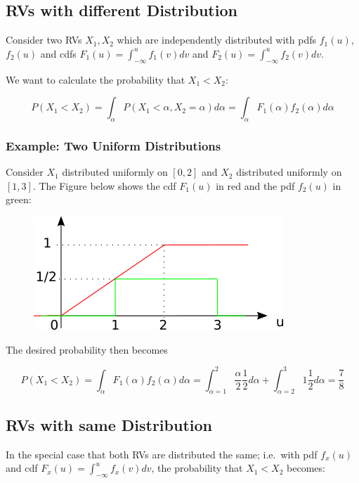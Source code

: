 
\subsection{RVs with different Distribution}

Consider two RVs \(X_1, X_2\) which are independently distributed with
pdfs \(f_1(u)\), \(f_2(u)\) and cdfs
\(F_1(u) = \int_{-\infty}^u f_1(v)dv\) and
\(F_2(u) = \int_{-\infty}^u f_2(v)dv\).

We want to calculate the probability that \(X_1 < X_2\):

\[
P(X_1 < X_2) = \int_\alpha P(X_1<\alpha, X_2=\alpha) d\alpha = \int_\alpha F_1(\alpha) f_2(\alpha) d\alpha
\]

\subsubsection{Example: Two Uniform Distributions}

Consider \(X_1\) distributed uniformly on \([0,2]\) and \(X_2\)
distributed uniformly on \([1,3]\). The Figure below shows the cdf
\(F_1(u)\) in red and the pdf \(f_2(u)\) in green:

\begin{figure}[H]
\includegraphics{images/rv_relation_1.png}
\end{figure}

The desired probability then becomes

\[
P(X_1 < X_2) = \int_\alpha F_1(\alpha) f_2(\alpha) d\alpha = \int_{\alpha=1}^{2} \frac{\alpha}{2} \frac{1}{2} d\alpha + \int_{\alpha=2}^{3} 1 \frac{1}{2} d\alpha = \frac{7}{8}
\]

\subsection{RVs with same Distribution}

In the special case that both RVs are distributed the same; i.e.~with
pdf \(f_x(u)\) and cdf \(F_x(u) = \int_{-\infty}^u f_x(v)dv\), the
probability that \(X_1 < X_2\) becomes:

